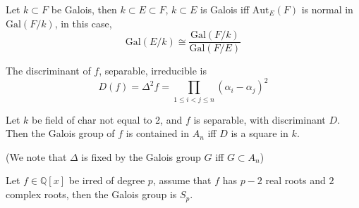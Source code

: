 \documentclass[openany]{book}
\newcommand{\Q}{\mathbb{Q}}
\newcommand{\gal}{\text{Gal}}
\begin{document}
\begin{thm}
    Let $k\subset F$ be Galois, then $k\subset E\subset F$, $k\subset E$ is Galois iff $\text{Aut}_E(F)$ is normal in $\gal(F/k)$, in this case, 
    \begin{equation*}
        \gal(E/k)\cong\frac{\gal(F/k)}{\gal(F/E)}
    \end{equation*}
\end{thm}


\begin{defn}[discriminant]
    The discriminant of $f$, separable, irreducible is 
    \begin{equation*}
        D(f)=\Delta^2f=\prod_{1\leq i<j\leq n}(\alpha_i-\alpha_j)^2
    \end{equation*}
\end{defn}

\begin{prop}
    Let $k$ be field of char not equal to 2, and $f$ is separable, with discriminant $D$. Then the Galois group of $f$ is contained in $A_n$ iff $D$ is a square in $k$.

    (We note that $\Delta$ is fixed by the Galois group $G$ iff $G\subset A_n$)
\end{prop}

\begin{prop}
    Let $f\in\Q[x]$ be irred of degree $p$, assume that $f$ has $p-2$ real roots and $2$ complex roots, then the Galois group is $S_p$.
\end{prop}
\end{document}
